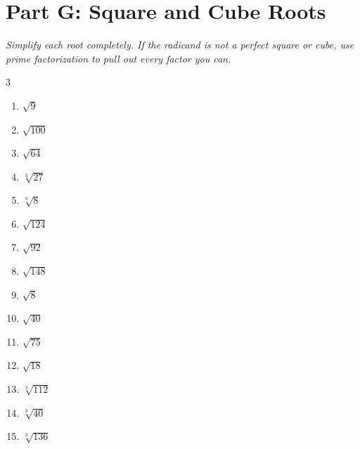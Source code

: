 \documentclass[11pt]{article}
\begin{document}
\section*{Part G: Square and Cube Roots}
\noindent\textit{Simplify each root completely. If the radicand is not a perfect square or cube, use prime factorization to pull out every factor you can.}
\begin{multicols}{3}
\begin{enumerate}
  \item $\sqrt{9}$
  \vspace{1.6cm}
  \item $\sqrt{100}$
  \vspace{1.6cm}
  \item $\sqrt{64}$
  \vspace{1.6cm}
  \item $\sqrt[3]{27}$
  \vspace{1.6cm}
  \item $\sqrt[3]{8}$
  \vspace{1.6cm}
  \item $\sqrt{124}$
  \vspace{1.6cm}
  \item $\sqrt{92}$
  \vspace{1.6cm}
  \item $\sqrt{148}$
  \vspace{1.6cm}
  \item $\sqrt{8}$
  \vspace{1.6cm}
  \item $\sqrt{40}$
  \vspace{1.6cm}
  \item $\sqrt{75}$
  \vspace{1.6cm}
  \item $\sqrt{18}$
  \vspace{1.6cm}
  \item $\sqrt[3]{112}$
  \vspace{1.6cm}
  \item $\sqrt[3]{40}$
  \vspace{1.6cm}
  \item $\sqrt[3]{136}$
  \vspace{1.6cm}
\end{enumerate}
\end{multicols}
\end{document}

